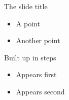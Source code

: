 
\begin{frame}{The slide title}
  \begin{itemize}
    \item A point
    \item Another point
  \end{itemize}
\end{frame}

\begin{frame}
\end{frame}

\begin{frame}[plain]
\end{frame}

\begin{frame}{Built up in steps}
  \begin{itemize}
    \item<1-> Appears first
    \item<2-> Appears second
  \end{itemize}
\end{frame}
